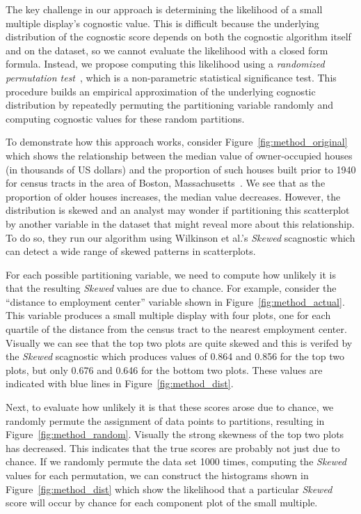 The key challenge in our approach is determining the likelihood of a small multiple display's cognostic value. This is difficult because the underlying distribution of the cognostic score depends on both the cognostic algorithm itself and on the dataset, so we cannot evaluate the likelihood with a closed form formula. Instead, we propose computing this likelihood using a \emph{randomized permutation test}~\cite{Good2000}, which is a non-parametric statistical significance test. This procedure builds an empirical approximation of the underlying cognostic distribution by repeatedly permuting the partitioning variable randomly and computing cognostic values for these random partitions.

To demonstrate how this approach works, consider
Figure~\ref{fig:method_original} which shows the relationship between the median value of owner-occupied houses (in thousands of US dollars) and the proportion of such houses built prior to 1940 for census tracts in the area of Boston, Massachusetts~\cite{Harrison1978}. We see that as the proportion of older houses increases, the median value decreases. However, the distribution is skewed and an analyst may wonder if partitioning this scatterplot by another variable in the dataset that might reveal more about this relationship.
To do so, they run our algorithm using Wilkinson et al.'s \emph{Skewed} scagnostic which can detect a wide range of skewed patterns in scatterplots.

For each possible partitioning variable, we need to compute how unlikely it is that the resulting \emph{Skewed} values are due to chance. For example, consider the ``distance to employment center'' variable shown in Figure~\ref{fig:method_actual}. This variable produces a small multiple display with four plots, one for each quartile of the distance from the census tract to the nearest employment center. Visually we can see that the top two plots are quite skewed and this is verifed by the \emph{Skewed} scagnostic which produces values of 0.864 and 0.856 for the top two plots, but only 0.676 and 0.646 for the bottom two plots. These values are indicated with blue lines in  Figure~\ref{fig:method_dist}.

Next, to evaluate how unlikely it is that these scores arose due to chance, we randomly permute the assignment of data points to partitions, resulting in Figure~\ref{fig:method_random}. Visually the strong skewness of the top two plots has decreased. This indicates that the true scores are probably not just due to chance. If we randomly permute the data set 1000 times, computing the \emph{Skewed} values for each permutation, we can construct the histograms shown in Figure~\ref{fig:method_dist} which show the likelihood that a particular \emph{Skewed} score will occur by chance for each component plot of the small multiple.

